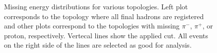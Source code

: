 \documentclass[prc,twocolumn,superscriptaddress,showpacs,amssymb,amsmath,amsfonts,linenumbers,aps]{revtex4-1}
\begin{document}



























\begin{figure}[htp]
\begin{center}
\caption{\small   Missing energy distributions for various topologies. Left plot corresponds to the topology where all final hadrons are registered and other plots correspond to the topologies with missing $\pi^-$, $\pi^+$, or proton, respectively. Vertecal lines show the applied cut. All events on the right side of the lines are selected as good for analysis.\label{fig:miss_en}}
\end{center}
\end{figure}
\end{document}

